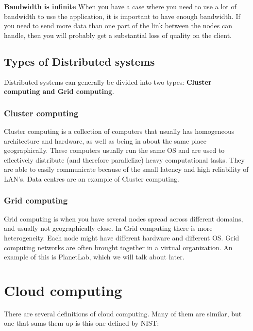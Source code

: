 \textbf{Bandwidth is infinite}
When you have a case where you need to use a lot of bandwidth to use the application, it is important to have enough bandwidth. If you need to send more data than one part of the link between the nodes can handle, then you will probably get a substantial loss of quality on the client. 




\subsection{Types of Distributed systems}
Distributed systems can generally be divided into two types: \textbf{Cluster computing and Grid computing}.

\subsubsection{Cluster computing}
Cluster computing is a collection of computers that usually has homogeneous architecture and hardware, as well as being in about the same place geographically. These computers usually run the same OS and are used to effectively distribute (and therefore parallelize) heavy computational tasks. They are able to easily communicate because of the small latency and high reliability of LAN's. Data centres are an example of Cluster computing. 

\subsubsection{Grid computing}
Grid computing is when you have several nodes spread across different domains, and usually not geographically close. In Grid computing there is more heterogeneity. Each node might have different hardware and different OS. Grid computing networks are often brought together in a virtual organization. An example of this is PlanetLab, which we will talk about later. 








\section{Cloud computing}
There are several definitions of cloud computing. Many of them are similar, but one that sums them up is this one defined by NIST\cite{mell_nist_nodate}:


